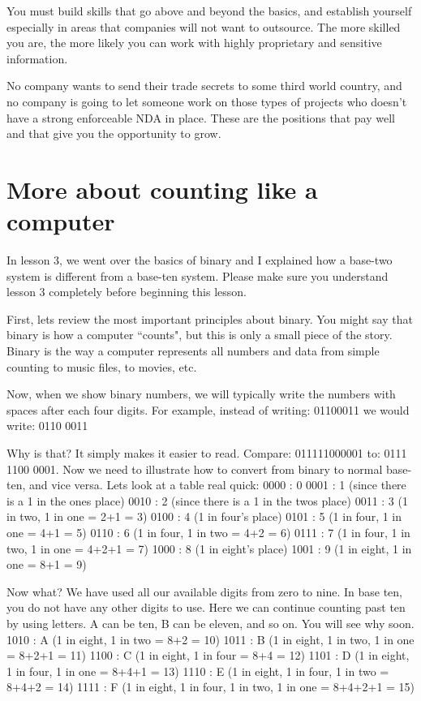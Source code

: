 \documentclass[a4paper,12pt]{article}
\let\stdsection\section
\renewcommand\section{\newpage\stdsection}
\begin{document}
You must build skills that go above and beyond the basics, and establish yourself especially in areas that companies will not want to outsource. The more skilled you are, the more likely you can work with highly proprietary and sensitive information.

No company wants to send their trade secrets to some third world country, and no company is going to let someone work on those types of projects who doesn't have a strong enforceable NDA in place. These are the positions that pay well and that give you the opportunity to grow.
\section{More about counting like a computer}
In lesson 3, we went over the basics of binary and I explained how a base-two system is different from a base-ten system. Please make sure you understand lesson 3 completely before beginning this lesson.

First, lets review the most important principles about binary. You might say that binary is how a computer ``counts", but this is only a small piece of the story. Binary is the way a computer represents all numbers and data from simple counting to music files, to movies, etc.

Now, when we show binary numbers, we will typically write the numbers with spaces after each four digits. For example, instead of writing: 01100011 we would write: 0110 0011

Why is that? It simply makes it easier to read. Compare: 011111000001 to: 0111 1100 0001. Now we need to illustrate how to convert from binary to normal base-ten, and vice versa. Lets look at a table real quick:
0000 : 0
0001 : 1 (since there is a 1 in the ones place)
0010 : 2 (since there is a 1 in the twos place)
0011 : 3 (1 in two, 1 in one = 2+1 = 3)
0100 : 4 (1 in four's place)
0101 : 5 (1 in four, 1 in one = 4+1 = 5)
0110 : 6 (1 in four, 1 in two = 4+2 = 6)
0111 : 7 (1 in four, 1 in two, 1 in one = 4+2+1 = 7)
1000 : 8 (1 in eight's place)
1001 : 9 (1 in eight, 1 in one = 8+1 = 9)

Now what? We have used all our available digits from zero to nine. In base ten, you do not have any other digits to use. Here we can continue counting past ten by using letters. A can be ten, B can be eleven, and so on. You will see why soon.
1010 : A (1 in eight, 1 in two = 8+2 = 10)
1011 : B (1 in eight, 1 in two, 1 in one = 8+2+1 = 11)
1100 : C (1 in eight, 1 in four = 8+4 = 12)
1101 : D (1 in eight, 1 in four, 1 in one = 8+4+1 = 13)
1110 : E (1 in eight, 1 in four, 1 in two = 8+4+2 = 14)
1111 : F (1 in eight, 1 in four, 1 in two, 1 in one = 8+4+2+1 = 15)
\end{document}
